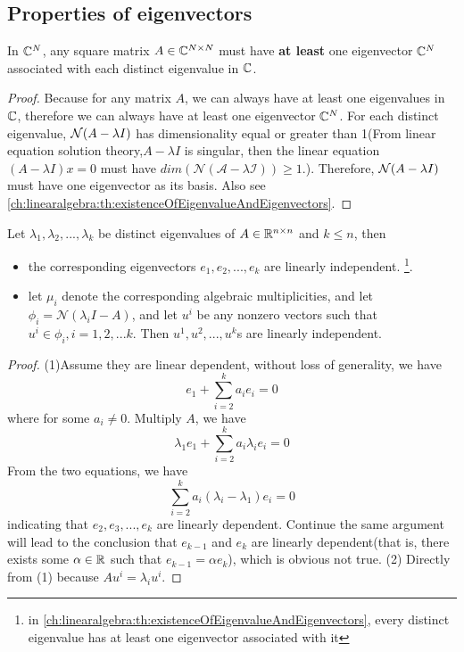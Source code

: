 \begin{refsection}
\subsection{Properties of eigenvectors}
\begin{theorem}
In $\mathbb{C}^N$, any square matrix $A\in \mathbb{C}^{N\times N}$ must have \textbf{at least} one eigenvector $\mathbb{C}^N$ associated with each distinct eigenvalue in $\mathbb{C}$.
\end{theorem}
\begin{proof}
Because for any matrix $A$, we can always have at least one eigenvalues in $\mathbb{C}$, therefore we can always have at least one eigenvector $\mathbb{C}^N$.
For each distinct eigenvalue, $\mathcal{N}(A - \lambda I)$ has dimensionality equal or greater than 1(From linear equation solution theory,$A - \lambda I$ is singular, then the linear equation $(A-\lambda I)x=0$ must have $dim(\mathcal{N(A-\lambda I)}) \geq 1$.). Therefore, $\mathcal{N}(A - \lambda I)$ must have one eigenvector as its basis. 	Also see \autoref{ch:linearalgebra:th:existenceOfEigenvalueAndEigenvectors}.
\end{proof}


\begin{lemma}\label{ch:linearalgebra:th:linearIndependenceOfEigenVectors}
Let $\lambda_1,\lambda_2,...,\lambda_k$ be distinct eigenvalues of $A \in \mathbb{R}^{n\times n}$ and $k\leq n$, then 
\begin{itemize}
	\item the corresponding eigenvectors $e_1,e_2,...,e_k$ are linearly independent. \footnote{in \autoref{ch:linearalgebra:th:existenceOfEigenvalueAndEigenvectors}, every distinct eigenvalue has at least one eigenvector associated with it}.
	\item let $\mu_i$ denote the corresponding algebraic multiplicities, and let $\phi_i = \mathcal{N}(\lambda_i I - A)$, and let $u^i$ be any nonzero vectors such that $u^i \in \phi_i,i=1,2,...k$. Then $u^1,u^2,...,u^k$s are linearly independent.  
\end{itemize}
\end{lemma}
\begin{proof}
(1)Assume they are linear dependent, without loss of generality, we have 
$$e_1+\sum_{i=2}^k a_i e_i = 0$$
where for some $a_i \neq 0$. Multiply $A$, we have
$$\lambda_1 e_1 + \sum_{i=2}^k a_i\lambda_i e_i = 0$$ From the two equations, we have 
$$\sum_{i=2}^k a_i (\lambda_i - \lambda_1)e_i =0$$
indicating that $e_2,e_3,...,e_k$ are linearly dependent. Continue the same argument will lead to the conclusion that $e_{k-1}$ and $e_k$ are linearly dependent(that is, there exists some $\alpha \in \mathbb{R}$ such that $e_{k-1} = \alpha e_k$), which is obvious not true.
(2) Directly from (1) because $Au^i = \lambda_i u^i.$	
\end{proof}




\end{refsection}
